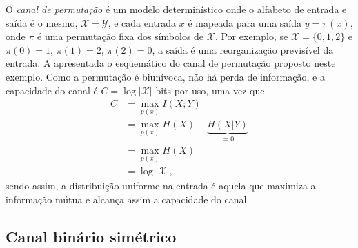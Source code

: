 O \emph{canal de permutação}\label{canal!de permutação} é um modelo determinístico onde o alfabeto de entrada e
saída é o mesmo, $\mathcal{X} = \mathcal{Y}$, e cada entrada $x$ é mapeada para uma saída 
$y = \pi(x)$, onde $\pi$ é uma permutação fixa dos símbolos de $\mathcal{X}$. Por exemplo, se
$\mathcal{X} = \{0, 1, 2\}$ e $\pi(0) = 1$, $\pi(1) = 2$, $\pi(2) = 0$, a saída é uma
reorganização previsível da entrada. A  apresentada o esquemático
do canal de permutação proposto neste exemplo.
Como a permutação é biunívoca, não há
perda de informação, e a capacidade do canal é $C = \log |\mathcal{X}|$ bits por uso, uma vez que
\begin{subequations}
  \begin{align}
    C &= \max_{p(x)} I(X;Y) \\
      &= \max_{p(x)} H(X) - \underbrace{H(X|Y)}_{=0} \\
      &= \max_{p(x)} H(X) \\
      &= \log |\mathcal{X}| ,
  \end{align}
\end{subequations}
sendo assim, a distribuição uniforme na entrada é aquela que maximiza a informação
mútua e alcança assim a capacidade do canal. 




\subsection{Canal binário simétrico}

\begin{marginfigure}%
  \centering
  \caption{Canal binário simétrico.}\label{fig:bsch}
\end{marginfigure}

